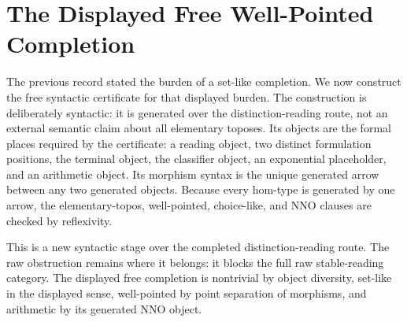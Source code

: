 \documentclass[11pt]{article}
\begin{document}
\section{The Displayed Free Well-Pointed Completion}

The previous record stated the burden of a set-like completion.  We now
construct the free syntactic certificate for that displayed burden.  The
construction is deliberately syntactic: it is generated over the
distinction-reading route, not an external semantic claim about all
elementary toposes.  Its objects are the formal places required by the
certificate: a reading object, two distinct formulation positions, the
terminal object, the classifier object, an exponential placeholder, and
an arithmetic object.  Its morphism syntax is the unique generated arrow
between any two generated objects.  Because every hom-type is generated
by one arrow, the elementary-topos, well-pointed, choice-like, and NNO
clauses are checked by reflexivity.

This is a new syntactic stage over the completed distinction-reading
route.  The raw obstruction remains where it belongs: it blocks the full
raw stable-reading category.  The displayed free completion is
nontrivial by object diversity, set-like in the displayed sense,
well-pointed by point separation of morphisms, and arithmetic by its
generated NNO object.
\end{document}
